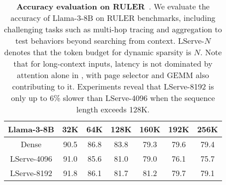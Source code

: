 \begin{table}[t]
\centering
\caption{\textbf{Accuracy evaluation on RULER}~\cite{nvidia_ruler}. We evaluate the accuracy of Llama-3-8B on RULER benchmarks, including challenging tasks such as multi-hop tracing and aggregation to test behaviors beyond searching from context. LServe-$N$ denotes that the token budget for dynamic sparsity is $N$. Note that for long-context inputs, latency is not dominated by attention alone in \system, with page selector and GEMM also contributing to it. Experiments reveal that LServe-8192 is only up to 6\% slower than LServe-4096 when the sequence length exceeds 128K.}
\scalebox{0.9}
{
\begin{tabular}{ccccccc}
\toprule
Llama-3-8B  & 32K  & 64K  & 128K & 160K	& 192K & 256K \\ \midrule
Dense       & 90.5 & 86.8 & 83.8 & 79.3 & 79.6 & 79.4 \\ \midrule
LServe-4096 & 91.0 & 85.6 & 81.0 & 79.0 & 76.1 & 75.7 \\ \midrule
LServe-8192 & 91.8 & 86.1 & 81.7 & 81.2 & 79.7 & 79.1 \\
\bottomrule
\end{tabular}
}
\label{tab:results:main_ruler}
\end{table}

